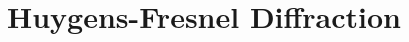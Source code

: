 \documentclass[12pt,twoside,english]{book}
\renewcommand{\~}{\perispomeni}%
\numberwithin{equation}{section}
\numberwithin{figure}{section}
\begin{document}
\chapter{Huygens-Fresnel Diffraction}
\end{document}
